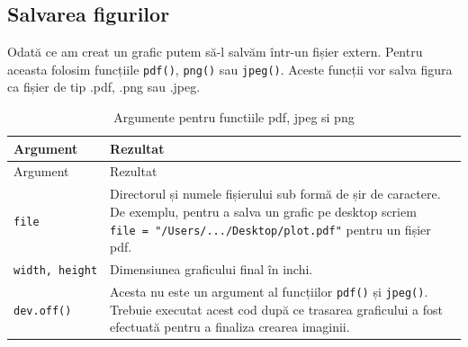 \documentclass[]{article}
\begin{document}
\subsection{Salvarea figurilor}\label{salvarea-figurilor}

Odată ce am creat un grafic putem să-l salvăm într-un fișier extern.
Pentru aceasta folosim funcțiile \texttt{pdf()}, \texttt{png()} sau
\texttt{jpeg()}. Aceste funcții vor salva figura ca fișier de tip .pdf,
.png sau .jpeg.

\begin{longtable}[]{@{}ll@{}}
\caption{Argumente pentru functiile pdf, jpeg si png}\tabularnewline
\toprule
\begin{minipage}[b]{0.14\columnwidth}\raggedright\strut
Argument\strut
\end{minipage} & \begin{minipage}[b]{0.71\columnwidth}\raggedright\strut
Rezultat\strut
\end{minipage}\tabularnewline
\midrule
\endfirsthead
\toprule
\begin{minipage}[b]{0.14\columnwidth}\raggedright\strut
Argument\strut
\end{minipage} & \begin{minipage}[b]{0.71\columnwidth}\raggedright\strut
Rezultat\strut
\end{minipage}\tabularnewline
\midrule
\endhead
\begin{minipage}[t]{0.14\columnwidth}\raggedright\strut
\texttt{file}\strut
\end{minipage} & \begin{minipage}[t]{0.71\columnwidth}\raggedright\strut
Directorul și numele fișierului sub formă de șir de caractere. De
exemplu, pentru a salva un grafic pe desktop scriem
\texttt{file\ =\ "/Users/.../Desktop/plot.pdf"} pentru un fișier
pdf.\strut
\end{minipage}\tabularnewline
\begin{minipage}[t]{0.14\columnwidth}\raggedright\strut
\texttt{width,\ height}\strut
\end{minipage} & \begin{minipage}[t]{0.71\columnwidth}\raggedright\strut
Dimensiunea graficului final în inchi.\strut
\end{minipage}\tabularnewline
\begin{minipage}[t]{0.14\columnwidth}\raggedright\strut
\texttt{dev.off()}\strut
\end{minipage} & \begin{minipage}[t]{0.71\columnwidth}\raggedright\strut
Acesta nu este un argument al funcțiilor \texttt{pdf()} și
\texttt{jpeg()}. Trebuie executat acest cod după ce trasarea graficului
a fost efectuată pentru a finaliza crearea imaginii.\strut
\end{minipage}\tabularnewline
\bottomrule
\end{longtable}
\end{document}

